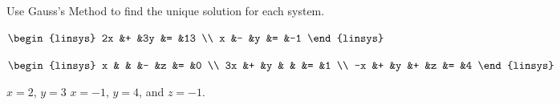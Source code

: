 

\begin{Exercise}[
name={},
title={}, 
difficulty=0,
origin={\cite{JH}}]
Use Gauss's Method to find the unique solution for each system.
\begin{multicols}{2}
\Question
$
\begin{linsys}{3}
      2x  &+  &3y  &=  &13  \\
          x   &-  &y   &=  &-1
\end{linsys}
$

\Question
$
\begin{linsys}{3}
          x   &  &  &-  &z  &=  &0  \\
          3x  &+ &y &   &   &=  &1  \\
          -x  &+ &y &+  &z  &=  &4
\end{linsys}
$
\EndCurrentQuestion
\end{multicols}
\end{Exercise}

\begin{Answer}
\Question $x=2$, $y=3$
\Question $x=-1$, $y=4$, and $z=-1$.
\end{Answer}
